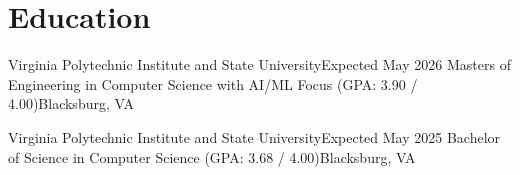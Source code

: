 \section{Education}
    \resumeSubHeadingListStart

    \resumeSubheading
    {Virginia Polytechnic Institute and State University}{Expected May 2026}
    {Masters of Engineering in Computer Science with AI/ML Focus (GPA: 3.90 / 4.00)}{Blacksburg, VA}

    \resumeSubheading
    {Virginia Polytechnic Institute and State University}{Expected May 2025}
    {Bachelor of Science in Computer Science (GPA: 3.68 / 4.00)}{Blacksburg, VA}
    \resumeItemListStart
    \resumeItemListEnd

    \resumeSubHeadingListEnd